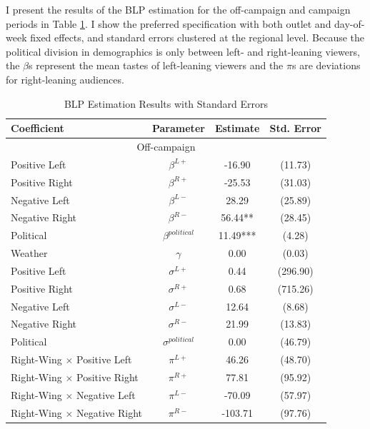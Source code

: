 \documentclass[12pt]{article}
\begin{document}
	\label{sec:results}
	
	
I present the results of the BLP estimation for the off-campaign and campaign periods in Table \ref{tab:results_blp}. I show the preferred specification with both outlet and day-of-week fixed effects, and standard errors clustered at the regional level. Because the political division in demographics is only between left- and right-leaning viewers, the \(\beta\)s represent the mean tastes of left-leaning viewers and the \(\pi\)s are deviations for right-leaning audiences.


\begin{table}[!htbp]
	\caption{BLP Estimation Results with Standard Errors}
	\label{tab:results_blp}
	\centering
	\begin{threeparttable}
		\begin{tabular}{lccc}
			\hline
			\textbf{Coefficient} & \textbf{Parameter} & \textbf{Estimate} & \textbf{Std. Error} \\
			\hline
			\multicolumn{4}{c}{Off-campaign} \\
			\hline
			\hline
			Positive Left & $\beta^{L+}$ & -16.90 & (11.73) \\
			Positive Right & $\beta^{R+}$ & -25.53 & (31.03) \\
			Negative Left & $\beta^{L-}$ & 28.29 & (25.89) \\
			Negative Right & $\beta^{R-}$ & 56.44** & (28.45) \\
			Political & $\beta^{political}$ & 11.49*** & (4.28) \\
			Weather & $\gamma$ & 0.00 & (0.03) \\
			\hline
			Positive Left & $\sigma^{L+}$ & 0.44 & (296.90) \\
			Positive Right & $\sigma^{R+}$ & 0.68 & (715.26) \\
			Negative Left & $\sigma^{L-}$ & 12.64 & (8.68) \\
			Negative Right & $\sigma^{R-}$ & 21.99 & (13.83) \\
			Political & $\sigma^{political}$ & 0.00 & (46.79) \\
			\hline
			Right-Wing $\times$  Positive Left & $\pi^{L+}$ & 46.26 & (48.70) \\
			Right-Wing $\times$  Positive Right & $\pi^{R+}$ & 77.81 & (95.92) \\
			Right-Wing $\times$  Negative Left & $\pi^{L-}$ & -70.09 & (57.97) \\
			Right-Wing $\times$  Negative Right & $\pi^{R-}$ & -103.71 & (97.76) \\

\end{tabular}
\end{threeparttable}
\end{table}
\end{document}
